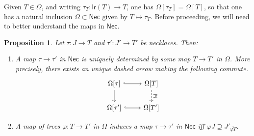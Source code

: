 \documentclass[a4paper,10pt
,draft
]{article}%
\numberwithin{equation}{section}
\numberwithin{figure}{section}
\newtheorem{proposition}[equation]{Proposition}%
\theoremstyle{definition} %
\newcommand{\1}{\ensuremath{\mathbbm 1}}%
\begin{document}
Given $T \in \Omega$,
and writing $\tau_T \colon \mathsf{lr}(T) \to T$,
one has 
$\Omega[\tau_T] = \Omega[T]$,
so that one has a natural inclusion
$\Omega \subset \mathsf{Nec}$
given by $T \mapsto \tau_T$.
Before proceeding, we will need to better understand the maps in 
$\mathsf{Nec}$.





\begin{proposition}\label{MAPNECK PROP}
	Let $\tau\colon J \to T$ and $\tau' \colon J' \to T'$ be necklaces. Then:
\begin{enumerate}
\item[(i)]
	A map $\tau \to \tau'$ in $\mathsf{Nec}$
	is uniquely determined by some map 
	$T \to T'$ in $\Omega$. 
	More precisely, there exists an unique dashed arrow
	making the following commute.
\begin{equation}\label{NECKMAP EQ}
\begin{tikzcd}
	\Omega[\tau] 
	\ar[hookrightarrow]{r} 
	\ar{d}
&
	\Omega[T] 
	\ar[dashed]{d}{\exists !}
\\
	\Omega[\tau']
	\ar[hookrightarrow]{r}
&
	\Omega[T']
	\end{tikzcd}
\end{equation}
\item[(ii)]
	A map of trees 
	$\varphi \colon T \to T'$ in $\Omega$
	induces a map 
	$\tau \to \tau'$ in $\mathsf{Nec}$
	iff
	$\varphi J \supseteq J'_{\overline{\varphi T}}$.
\end{enumerate}
\end{proposition}
\end{document}
